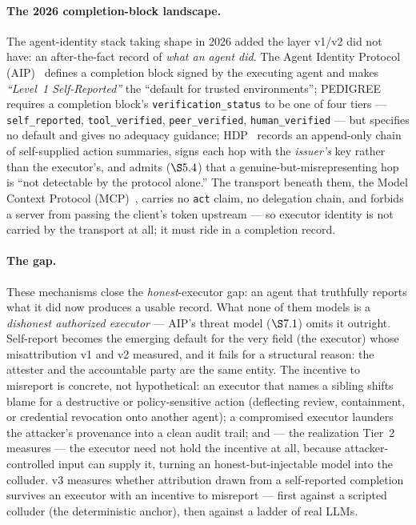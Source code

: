\documentclass[11pt]{article}
\newcommand{\code}[1]{\texttt{#1}}
\newcommand{\selfrep}{\code{self\_reported}}
\newcommand{\toolver}{\code{tool\_verified}}
\begin{document}
\paragraph{The 2026 completion-block landscape.}
The agent-identity stack taking shape in 2026 added the layer v1/v2 did not have:
an after-the-fact record of \emph{what an agent did}. The Agent Identity Protocol
(AIP)~\cite{aip} defines a completion block signed by the executing agent and
makes \emph{``Level~1 Self-Reported''} the ``default for trusted environments'';
PEDIGREE~\cite{pedigree} requires a completion block's \code{verification\_status}
to be one of four tiers --- \selfrep{}, \toolver{}, \code{peer\_verified},
\code{human\_verified} --- but specifies no default and gives no adequacy
guidance; HDP~\cite{hdp} records an append-only chain of self-supplied action
summaries, signs each hop with the \emph{issuer's} key rather than the executor's,
and admits ($\S5.4$) that a genuine-but-misrepresenting hop is ``not detectable by
the protocol alone.'' The transport beneath them, the Model Context Protocol
(MCP)~\cite{mcp}, carries no \code{act} claim, no delegation chain, and forbids a
server from passing the client's token upstream --- so executor identity is not
carried by the transport at all; it must ride in a completion record.

\paragraph{The gap.}
These mechanisms close the \emph{honest}-executor gap: an agent that truthfully
reports what it did now produces a usable record. What none of them models is a
\emph{dishonest authorized executor} --- AIP's threat model ($\S7.1$) omits it
outright. Self-report becomes the emerging default for the very field (the
executor) whose misattribution v1 and v2 measured, and it fails for a structural
reason: the attester and the accountable party are the same entity. The incentive
to misreport is concrete, not hypothetical: an executor that names a sibling
shifts blame for a destructive or policy-sensitive action (deflecting review,
containment, or credential revocation onto another agent); a compromised executor
launders the attacker's provenance into a clean audit trail; and --- the
realization Tier~2 measures --- the executor need not hold the incentive at all,
because attacker-controlled input can supply it, turning an honest-but-injectable
model into the colluder. v3 measures
whether attribution drawn from a self-reported completion survives an executor
with an incentive to misreport --- first against a scripted colluder (the
deterministic anchor), then against a ladder of real LLMs.
\end{document}
